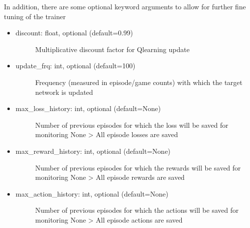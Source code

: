 \documentclass[letterpaper,10pt,english]{sphinxmanual}
\begin{document}
\sphinxAtStartPar
In addition, there are some optional keyword arguments to allow for further fine tuning of the trainer
\begin{itemize}
\item {} \begin{description}
\item[{discount: float, optional (default=0.99)}] \leavevmode
\sphinxAtStartPar
Multiplicative discount factor for Q\sphinxhyphen{}learning update

\end{description}

\item {} \begin{description}
\item[{update\_frq: int, optional (default=100)}] \leavevmode
\sphinxAtStartPar
Frequency (measured in episode/game counts) with which the target network is updated

\end{description}

\item {} \begin{description}
\item[{max\_loss\_history: int, optional (default=None)}] \leavevmode
\sphinxAtStartPar
Number of previous episodes for which the loss will be saved for monitoring
None \textendash{}\textgreater{} All episode losses are saved

\end{description}

\item {} \begin{description}
\item[{max\_reward\_history: int, optional (default=None)}] \leavevmode
\sphinxAtStartPar
Number of previous episodes for which the rewards will be saved for monitoring
None \textendash{}\textgreater{} All episode rewards are saved

\end{description}

\item {} \begin{description}
\item[{max\_action\_history: int, optional (default=None)}] \leavevmode
\sphinxAtStartPar
Number of previous episodes for which the actions will be saved for monitoring
None \textendash{}\textgreater{} All episode actions are saved

\end{description}


\end{itemize}
\end{document}
